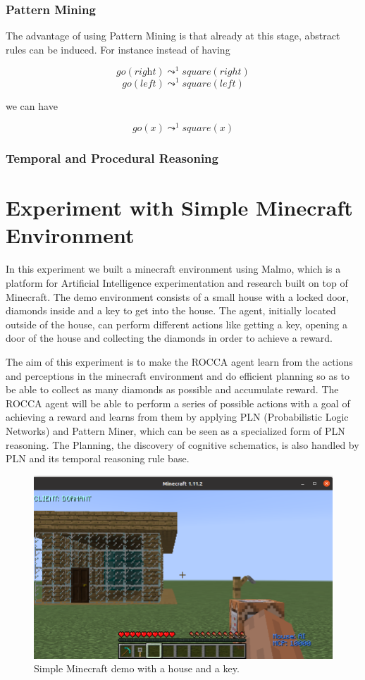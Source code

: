 \documentclass[runningheads]{llncs}
\newcommand{\lpreimp}[1]{\leadsto^{#1}}
\newcommand{\lgo}[1]{\textit{go}(#1)}
\begin{document}
\subsubsection{Pattern Mining}

The advantage of using Pattern Mining is that already at this stage,
abstract rules can be induced.  For instance instead of having

$$\lgo{\textit{right}} \lpreimp{1} square(right)$$
$$go(left) \lpreimp{1} square(left)$$

we can have

$$\lgo{x} \lpreimp{1} square(x)$$

\subsubsection{Temporal and Procedural Reasoning}

\section{Experiment with Simple Minecraft Environment}

In this experiment we built a minecraft environment using Malmo, which is a platform for Artificial Intelligence experimentation and research built on top of Minecraft. The demo environment consists of a small house with a locked door, diamonds inside and a key to get into the house. The agent, initially located outside of the house, can perform different actions like getting a key, opening a door of the house and collecting the diamonds in order to achieve a reward. \par
The aim of this experiment is to make the ROCCA agent learn from the actions and perceptions in the minecraft environment and do efficient planning so as to be able to collect as many diamonds as possible and accumulate reward. The ROCCA agent will be able to perform a series of possible actions with a goal of achieving a reward and learns from them by applying PLN (Probabilistic Logic Networks) and Pattern Miner, which can be seen as a specialized form of PLN reasoning. The Planning, the discovery of cognitive schematics, is also handled by PLN and its temporal reasoning rule base.

\begin{figure}[htbp]
\centerline{\includegraphics[scale=.2]{pictures/simple_demo.png}}
\caption{Simple Minecraft demo with a house and a key.}
\label{fig}
\end{figure}
\end{document}
